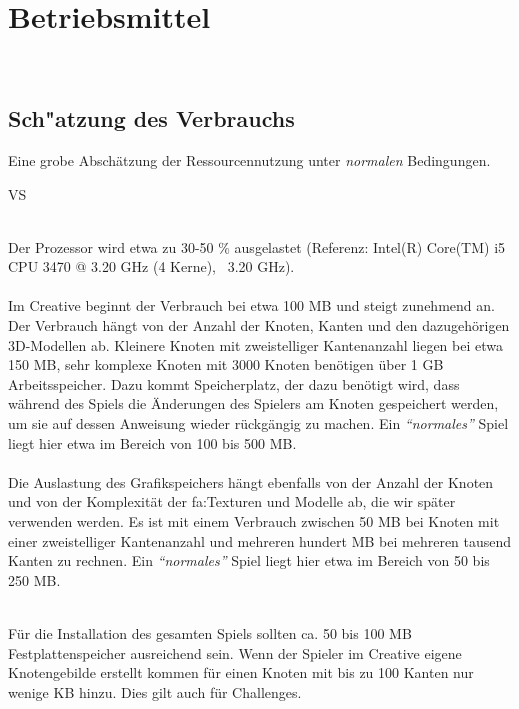 %
%


\chapter{Betriebsmittel}
\label{BM}~\\

\section{Sch{"a}tzung des Verbrauchs}
\label{BM:Verbrauch}

Eine grobe Abschätzung der Ressourcennutzung unter \textit{normalen} Bedingungen.\\

\begin{ids}{\gls{VS}}

	 \hfill\\

	Der Prozessor wird etwa zu 30-50 \% ausgelastet (Referenz: Intel(R) Core(TM) i5 CPU 3470 @ 3.20 GHz (4 Kerne), ~3.20 GHz).\\
	
	 \hfill\\
	
	Im Creative beginnt der Verbrauch bei etwa 100 MB und steigt zunehmend an. Der Verbrauch hängt von der Anzahl der Knoten, Kanten und den dazugehörigen 3D-Modellen ab. Kleinere Knoten mit zweistelliger Kantenanzahl	liegen bei etwa 150 MB, sehr komplexe Knoten mit 3000 Knoten benötigen über 1 GB Arbeitsspeicher. Dazu kommt Speicherplatz, der dazu benötigt wird, dass während des Spiels die Änderungen des Spielers am Knoten gespeichert werden, um sie auf dessen Anweisung wieder rückgängig zu machen. Ein \textit{\textquotedblleft{}normales\textquotedblright} Spiel liegt hier etwa im Bereich von 100 bis 500 MB.\\

	 \hfill\\
	
	Die Auslastung des Grafikspeichers hängt ebenfalls von der Anzahl der Knoten und von der Komplexität der \gls{fa:Textur}en und Modelle ab, die wir später verwenden werden. Es ist mit einem Verbrauch zwischen 50 MB bei Knoten mit einer zweistelliger Kantenanzahl und mehreren hundert MB bei mehreren tausend Kanten zu rechnen.
	Ein \textit{\textquotedblleft{}normales\textquotedblright} Spiel liegt hier etwa im Bereich von 50 bis 250 MB.


\clearpage


	 \hfill\\
		
	Für die Installation des gesamten Spiels sollten ca. 50 bis 100 MB Festplattenspeicher ausreichend sein. Wenn der Spieler im Creative eigene Knotengebilde erstellt kommen für einen Knoten mit bis zu 100 Kanten nur wenige KB hinzu. Dies gilt auch für Challenges.\\

\end{ids}


